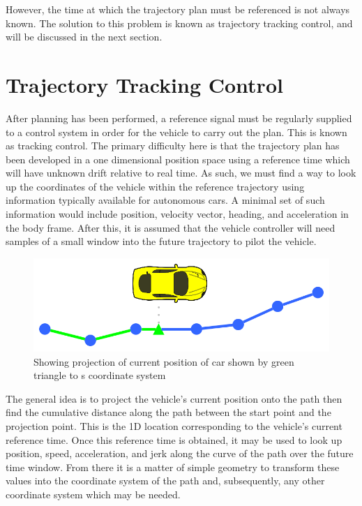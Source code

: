 \documentclass[letterpaper, 10 pt, conference]{ieeeconf}  %
\begin{document}
However, the time at which the trajectory plan must be referenced is not always known.
The solution to this problem is known as trajectory tracking control, and will be discussed in the next section.


\section{Trajectory Tracking Control} \label{sec:trajectorytracking}

After planning has been performed, a reference signal must be regularly supplied to a control system in order for the vehicle to carry out the plan.
This is known as tracking control.
The primary difficulty here is that the trajectory plan has been developed in a one dimensional position space using a reference time which will have unknown drift relative to real time.
As such, we must find a way to look up the coordinates of the vehicle within the reference trajectory using information typically available for autonomous cars.
A minimal set of such information would include position, velocity vector, heading, and acceleration in the body frame.
After this, it is assumed that the vehicle controller will need samples of a small window into the future trajectory to pilot the vehicle.

\begin{figure}[thpb]
  \centering
  \includegraphics[width=0.5\columnwidth]{graphics/PathProjection.png}
  \caption{Showing projection of current position of car shown by green triangle to s coordinate system}
  \label{fig:cartos}
\end{figure}

The general idea is to project the vehicle's current position onto the path then find the cumulative distance along the path between the start point and the projection point.
This is the 1D location corresponding to the vehicle's current reference time.
Once this reference time is obtained, it may be used to look up position, speed, acceleration, and jerk along the curve of the path over the future time window.
From there it is a matter of simple geometry to transform these values into the coordinate system of the path and, subsequently, any other coordinate system which may be needed.
\end{document}
